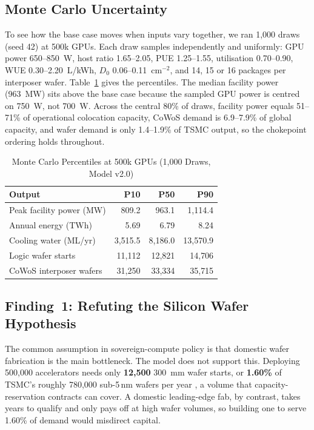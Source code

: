\documentclass[conference]{IEEEtran}
\begin{document}
\subsection{Monte Carlo Uncertainty}

To see how the base case moves when inputs vary together, we ran 1{,}000 draws (seed 42) at 500k GPUs. Each draw samples independently and uniformly: GPU power 650--850~W, host ratio 1.65--2.05, PUE 1.25--1.55, utilisation 0.70--0.90, WUE 0.30--2.20~L/kWh, $D_0$ 0.06--0.11~cm$^{-2}$, and 14, 15 or 16 packages per interposer wafer. Table~\ref{tab:mc} gives the percentiles. The median facility power (963~MW) sits above the base case because the sampled GPU power is centred on 750~W, not 700~W. Across the central 80\% of draws, facility power equals 51--71\% of operational colocation capacity, CoWoS demand is 6.9--7.9\% of global capacity, and wafer demand is only 1.4--1.9\% of TSMC output, so the chokepoint ordering holds throughout.

\begin{table}[t]
\centering
\caption{Monte Carlo Percentiles at 500k GPUs (1{,}000 Draws, Model v2.0)}
\label{tab:mc}
\footnotesize
\begin{tabular*}{\columnwidth}{@{\extracolsep{\fill}}lrrr@{}}
\toprule
\textbf{Output} & \textbf{P10} & \textbf{P50} & \textbf{P90} \\
\midrule
Peak facility power (MW) & 809.2 & 963.1 & 1{,}114.4 \\
Annual energy (TWh) & 5.69 & 6.79 & 8.24 \\
Cooling water (ML/yr) & 3{,}515.5 & 8{,}186.0 & 13{,}570.9 \\
Logic wafer starts & 11{,}112 & 12{,}821 & 14{,}706 \\
CoWoS interposer wafers & 31{,}250 & 33{,}334 & 35{,}715 \\
\bottomrule
\end{tabular*}
\end{table}

\subsection{Finding~1: Refuting the Silicon Wafer Hypothesis}

The common assumption in sovereign-compute policy is that domestic wafer fabrication is the main bottleneck. The model does not support this. Deploying 500{,}000 accelerators needs only \textbf{12{,}500} 300~mm wafer starts, or \textbf{1.60\%} of TSMC's roughly 780{,}000 sub-5\,nm wafers per year \cite{tsmc2025annual}, a volume that capacity-reservation contracts can cover. A domestic leading-edge fab, by contrast, takes years to qualify and only pays off at high wafer volumes, so building one to serve 1.60\% of demand would misdirect capital.
\end{document}
